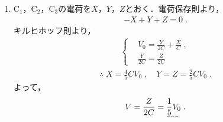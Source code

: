 \documentclass[../../../all/physics-standard_answers_all.tex]{subfiles}
\begin{document}
\begin{enumerate}
    \item C$_1$，C$_2$，C$_3$の電荷を$X$，$Y$，$Z$とおく．電荷保存則より，
        \begin{align*}
            -X + Y + Z = 0 \;.
        \end{align*}
        キルヒホッフ則より，
        \begin{align*}
            \left\{
            \begin{aligned}
                & V_0 = \frac{Y}{2C} +  \frac{X}{C} \;, \\
                & \frac{Y}{2C} = \frac{Z}{2C}
            \end{aligned}
            \right.
        \end{align*}
        \begin{align*}
                \text{∴} \; X = \frac{4}{5} CV_0 \;,
                \quad Y = Z = \frac{2}{5} CV_0 \;.
        \end{align*}
        よって，
        \begin{align*}
            V = \frac{Z}{2C} = \uwave{\frac{1}{5} V_0} \;.
        \end{align*}        

\end{enumerate}
\end{document}
